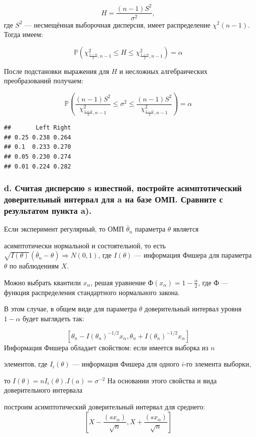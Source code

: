 \documentclass[]{article}
\begin{document}
\[H={\frac {(n-1)S^{2}}{\sigma ^{2}}},\] где \(S^{2}\) --- несмещённая
выборочная дисперсия, имеет распределение \(\chi ^{2}(n-1)\). Тогда
имеем:

\[ \mathbb {P} \left(\chi _{{\frac {1-\alpha }{2}},n-1}^{2}\leqslant H\leqslant \chi _{{\frac {1+\alpha }{2}},n-1}^{2}\right)=\alpha\]

После подстановки выражения для \(H\) и несложных алгебраических
преобразований получаем:

\[ \mathbb {P} \left({\frac {(n-1)S^{2}}{\chi _{{\frac {1+\alpha }{2}},n-1}^{2}}}\leqslant \sigma ^{2}\leqslant {\frac {(n-1)S^{2}}{\chi _{{\frac {1-\alpha }{2}},n-1}^{2}}}\right)=\alpha\]

\begin{verbatim}
##       Left Right
## 0.25 0.238 0.264
## 0.1  0.233 0.270
## 0.05 0.230 0.274
## 0.01 0.224 0.282
\end{verbatim}

\subsubsection{d. Считая дисперсию s известной, постройте
асимптотический доверительный интервал для a на базе ОМП. Сравните с
результатом пункта a).}\label{d.---s-------a---.-----a.}

Если эксперимент регулярный, то ОМП \(\bar θ_n\) параметра \(θ\)
является

асимптотически нормальной и состоятельной, то есть
\(\sqrt{I(θ)}(\bar θ_n − θ)⇒ N(0,1)\), где \(I(θ)\) --- информация
Фишера для параметра \(θ\) по наблюдениям \(X\).

Можно выбрать квантили \(x_α\), решая уравнение
\(Ф(x_α) = 1- \frac {α}{2}\), где \(Ф\) --- функция распределения
стандартного нормального закона.

В этом случае, в общем виде для параметра \(θ\) доверительный интервал
уровня \(1-α\) будет выглядеть так:

\[[ θ_n − I( θ_n)^{−1 /2} x_{\alpha} , θ_n + I( θ_n)^{−1 /2} x_{\alpha}]\]
Информация Фишера обладает свойством: если имеется выборка из \(n\)

элементов, где \(I_i(θ)\) --- информация Фишера для одного \(i\)-го
элемента выборки,

то \(I(θ)=nI_i(θ)\).\(I(a) = σ^{−2}\) На основании этого свойства и вида
доверительного интервала

построим асимптотический доверительный интервал для среднего:
\[[X−\frac {(sx_α)}{\sqrt n}, X+\frac {(sx_α)}{\sqrt n} ]\]
\end{document}
